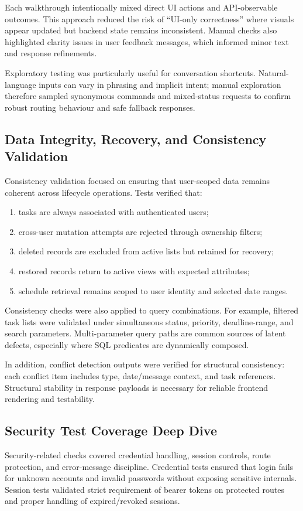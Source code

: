 \documentclass[12pt]{article}
\begin{document}
Each walkthrough intentionally mixed direct UI actions and API-observable outcomes. This approach reduced the risk of ``UI-only correctness'' where visuals appear updated but backend state remains inconsistent. Manual checks also highlighted clarity issues in user feedback messages, which informed minor text and response refinements.

Exploratory testing was particularly useful for conversation shortcuts. Natural-language inputs can vary in phrasing and implicit intent; manual exploration therefore sampled synonymous commands and mixed-status requests to confirm robust routing behaviour and safe fallback responses.

\subsection{Data Integrity, Recovery, and Consistency Validation}
Consistency validation focused on ensuring that user-scoped data remains coherent across lifecycle operations. Tests verified that:
\begin{enumerate}
    \item tasks are always associated with authenticated users;
    \item cross-user mutation attempts are rejected through ownership filters;
    \item deleted records are excluded from active lists but retained for recovery;
    \item restored records return to active views with expected attributes;
    \item schedule retrieval remains scoped to user identity and selected date ranges.
\end{enumerate}

Consistency checks were also applied to query combinations. For example, filtered task lists were validated under simultaneous status, priority, deadline-range, and search parameters. Multi-parameter query paths are common sources of latent defects, especially where SQL predicates are dynamically composed.

In addition, conflict detection outputs were verified for structural consistency: each conflict item includes type, date/message context, and task references. Structural stability in response payloads is necessary for reliable frontend rendering and testability.

\subsection{Security Test Coverage Deep Dive}
Security-related checks covered credential handling, session controls, route protection, and error-message discipline. Credential tests ensured that login fails for unknown accounts and invalid passwords without exposing sensitive internals. Session tests validated strict requirement of bearer tokens on protected routes and proper handling of expired/revoked sessions.
\end{document}
